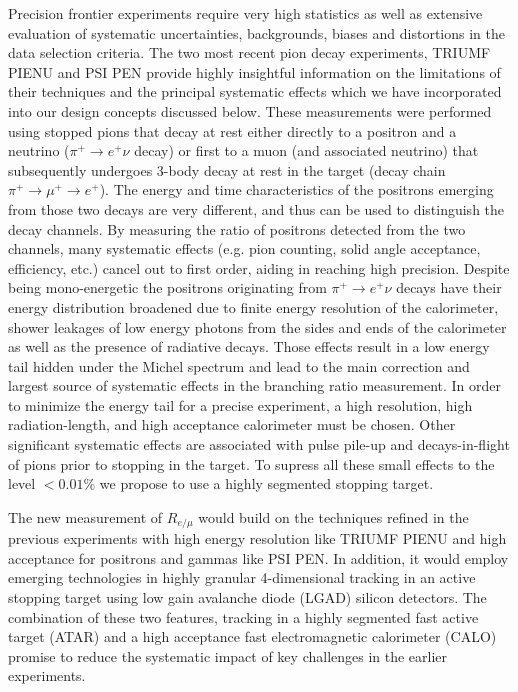 
Precision frontier experiments require very high statistics as well as extensive evaluation of systematic uncertainties, backgrounds, biases and distortions in the data selection criteria. The two most recent pion decay experiments, TRIUMF PIENU and PSI PEN  provide highly insightful information on the  limitations of their techniques and the principal systematic effects which we have incorporated into our design concepts discussed below. These  measurements were performed using stopped pions that decay at rest either directly to a positron and a neutrino ($\pi^+ \rightarrow e^+ \nu$ decay) or first to a muon (and associated neutrino) that subsequently undergoes 3-body decay at rest in the target (decay chain $\pi^+ \rightarrow \mu^+ \rightarrow e^+$).  The  energy and time characteristics of the positrons emerging from those two decays are very different, and thus can be used to distinguish the decay channels. By measuring the ratio of positrons detected from the two channels, many systematic effects (e.g. pion counting, solid angle acceptance, efficiency, etc.) cancel out to first order, aiding in reaching high precision.  Despite being  mono-energetic the positrons originating from $\pi^+ \rightarrow e^+ \nu$ decays have their energy distribution broadened due to finite energy resolution of the calorimeter, shower leakages of low energy photons from the sides and ends of the calorimeter as well as the presence of radiative decays. Those effects result in a low energy tail hidden under the Michel spectrum and lead to the main correction and largest source of systematic effects in the branching ratio measurement. In order to minimize the energy tail for a precise experiment, a high resolution,  high radiation-length, and high acceptance calorimeter must be chosen.  Other significant systematic effects are associated with pulse pile-up and decays-in-flight of pions prior to stopping in the target. To supress all these  small effects to the level $< 0.01\%$ we propose to use a highly segmented stopping target.

The new measurement of $R_{e/\mu}$ would build on the techniques refined in the previous
experiments with high energy resolution like TRIUMF PIENU and high acceptance for positrons and
gammas like PSI PEN. In addition, it would employ emerging technologies in 
highly granular 4-dimensional tracking in an active stopping target using low gain avalanche 
diode (LGAD) silicon detectors. The combination of these two features, tracking in a highly
segmented fast active target (ATAR) and a high acceptance fast electromagnetic calorimeter (CALO) promise
to reduce the systematic impact of key challenges in the earlier experiments.

